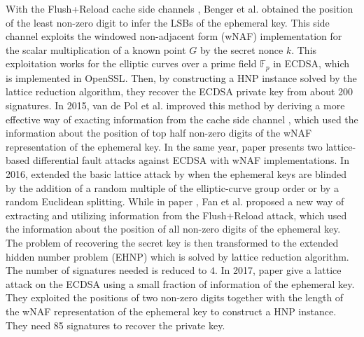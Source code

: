 With the Flush+Reload cache side channels \cite{flushreload},
	Benger et al. \cite{Benger2014} obtained the position of the least non-zero digit to infer the LSBs of the ephemeral key.
This side channel exploits
	the windowed non-adjacent form (wNAF) implementation \cite{GORDON1998129,Miyaji1997,Koyama1002,Solinas2000}
	for the scalar multiplication	
		of a known point $G$ by the secret nonce $k$.
This exploitation works for the elliptic curves over a prime field $\mathbb{F}_{p}$
			in ECDSA, which is implemented in OpenSSL\cite{openssl}.
Then,
	by constructing a HNP instance solved by the lattice reduction algorithm, they recover the ECDSA private key from about 200 signatures.
In 2015, van de Pol et al. improved this method by deriving a more effective way of exacting information from the cache side channel \cite{Van2015},
 which used the information about the position of top half non-zero digits of the wNAF representation of the ephemeral key.
In the same year, paper \cite{Cao2015} presents two lattice-based differential fault attacks against ECDSA with wNAF implementations.
In 2016, \cite{Dahmun2016}  extended the basic lattice attack by when the ephemeral keys are blinded by the addition of a random multiple of the elliptic-curve group order or by a random Euclidean splitting.
While in paper \cite{Fan2016}, Fan et al. proposed a new way of extracting and utilizing information from the Flush+Reload attack,
which used the information about the position of all non-zero digits of the ephemeral key. The problem of recovering the
secret key is then transformed to the extended hidden number problem (EHNP) which is solved by lattice reduction algorithm. The number of signatures needed is reduced to $4$.
In 2017, paper \cite{Wang2017} give a lattice attack on the ECDSA using
 a small fraction of information of the ephemeral key.
They exploited the positions of two non-zero digits together with the length of the wNAF representation of the ephemeral key to construct a HNP instance. They need 85 signatures to recover the private key.



